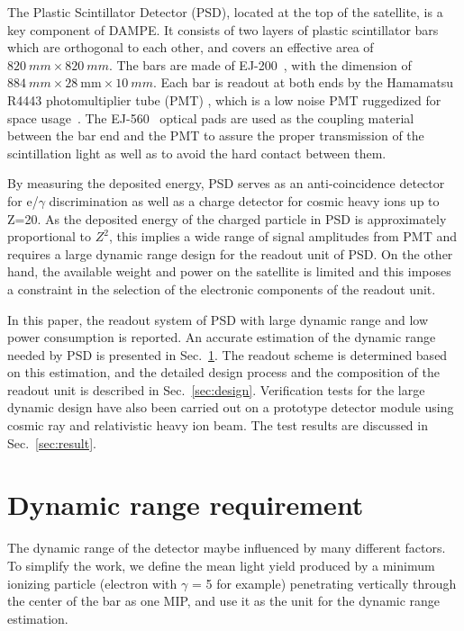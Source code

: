 \documentclass[preprint, times]{elsarticle}
\begin{document}
The Plastic Scintillator Detector (PSD), located at the top of the satellite, is a key component of DAMPE. 
It consists of two layers of plastic scintillator bars which are orthogonal to each other, and covers an effective area of
$\SI{820}{mm}\times\SI{820}{mm}$. 
The bars are made of EJ-200~\cite{scintillator}, with the dimension of $\SI{884}{mm} \times \SI{28}{\milli\meter} \times \SI{10}{mm}$.
Each bar  is readout at both ends by the Hamamatsu R4443 photomultiplier tube (PMT) , which is a low noise PMT ruggedized for space usage~\cite{r4443}. 
The EJ-560~\cite{scintillator} optical pads are used as the  coupling material between the bar end and the PMT to assure the proper transmission of the scintillation light as well as to avoid the hard contact between them.

By measuring the deposited energy, PSD serves as an anti-coincidence detector for e/$\gamma$ discrimination as well as a charge detector for cosmic heavy ions up to Z=20.
As the deposited energy of the charged particle in PSD is approximately proportional to $Z^2$, this implies a wide range of signal amplitudes from PMT and requires a large dynamic range design for the readout unit of PSD.
On the other hand, the available weight and power on the satellite is limited and this imposes a constraint in the selection of the electronic components of the readout unit.

In this paper, the readout system of PSD with large dynamic range and  low power consumption is reported.
An accurate estimation of the dynamic range needed by PSD is presented in Sec.~\ref{sec:requirement}.
The readout scheme is determined based on this estimation, and the detailed design process and the composition of the readout unit is described in Sec.~\ref{sec:design}.
Verification tests for the large dynamic design have also been carried out on a prototype detector module using cosmic ray and relativistic heavy ion beam.
The test results are discussed in Sec.~\ref{sec:result}.


\section{Dynamic range requirement}
\label{sec:requirement}

The dynamic range of the detector maybe influenced by many different factors. To simplify the work, we define the mean light yield produced by a minimum ionizing particle (electron with $\gamma$ = 5 for example) penetrating vertically through the center of the bar as one MIP, and use it as the unit for the dynamic range estimation.
\end{document}
